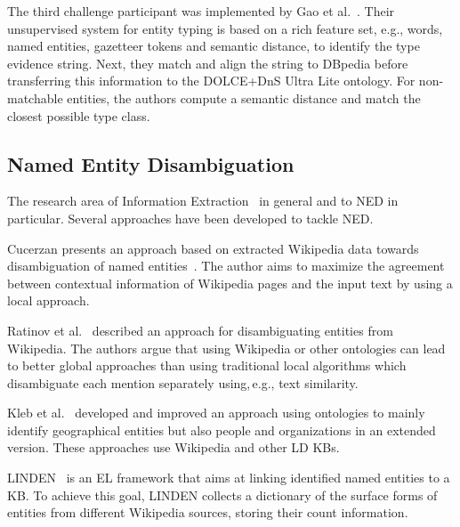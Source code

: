 The third challenge participant was implemented by Gao et al.~\cite{oak_sheffield}. 
Their unsupervised system for entity typing is based on a rich feature set, e.g., words, named entities, gazetteer tokens and semantic distance, to identify the type evidence string. 
Next, they match and align the string to DBpedia before transferring this information to the DOLCE+DnS Ultra Lite ontology.
For non-matchable entities, the authors compute a semantic distance and match the closest possible type class.  




\subsection{Named Entity Disambiguation}

The research area of Information Extraction~\cite{nad:sek} in general and to \ac{NED} in particular.
Several approaches have been developed to tackle \ac{NED}.
\bigskip


Cucerzan presents an approach based on extracted Wikipedia data towards disambiguation of named entities~\cite{Cucerzan07}.
The author aims to maximize the agreement between contextual information of Wikipedia pages and the input text by using a local approach.


Ratinov et al.~\cite{rat:rot} described an approach for disambiguating entities from Wikipedia. 
The authors argue that using Wikipedia or other ontologies can lead to better global approaches than using traditional local algorithms which disambiguate each mention separately using,\,e.g., text similarity. %

Kleb et al.~\cite{Kleb11WIMS,KlebESWC10} developed and improved an approach using ontologies to mainly identify geographical entities but also people and organizations in an extended version. 
These approaches use Wikipedia and other \ac{LD} \ac{KB}s.

LINDEN~\cite{LINDEN} is an \ac{EL} framework that aims at linking identified named entities to a \ac{KB}.
To achieve this goal, LINDEN collects a dictionary of the surface forms of entities from different Wikipedia sources, storing their count information.

